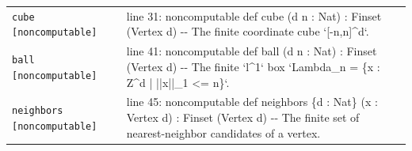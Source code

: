 \documentclass[10pt]{article}
\begin{document}
\begin{longtable}{>{\raggedright\arraybackslash}p{} >{\raggedright\arraybackslash}p{}}
\texttt{cube [noncomputable]} & {\ttfamily\scriptsize line 31:\allowbreak{} noncomputable def cube (\allowbreak{}d n :\allowbreak{} Nat)\allowbreak{} :\allowbreak{} Finset (\allowbreak{}Vertex d)\allowbreak{} -\allowbreak{}-\allowbreak{} The finite coordinate cube `[-\allowbreak{}n,\allowbreak{}n]\textasciicircum{}d`.\allowbreak{}} \\[0.45em]
\texttt{ball [noncomputable]} & {\ttfamily\scriptsize line 41:\allowbreak{} noncomputable def ball (\allowbreak{}d n :\allowbreak{} Nat)\allowbreak{} :\allowbreak{} Finset (\allowbreak{}Vertex d)\allowbreak{} -\allowbreak{}-\allowbreak{} The finite `l\textasciicircum{}1` box `Lambda\_\allowbreak{}n =\allowbreak{} \{x :\allowbreak{} Z\textasciicircum{}d | ||x||\_\allowbreak{}1 <=\allowbreak{} n\}`.\allowbreak{}} \\[0.45em]
\texttt{neighbors [noncomputable]} & {\ttfamily\scriptsize line 45:\allowbreak{} noncomputable def neighbors \{d :\allowbreak{} Nat\} (\allowbreak{}x :\allowbreak{} Vertex d)\allowbreak{} :\allowbreak{} Finset (\allowbreak{}Vertex d)\allowbreak{} -\allowbreak{}-\allowbreak{} The finite set of nearest-\allowbreak{}neighbor candidates of a vertex.\allowbreak{}} \\[0.45em]
\end{longtable}
\end{document}
